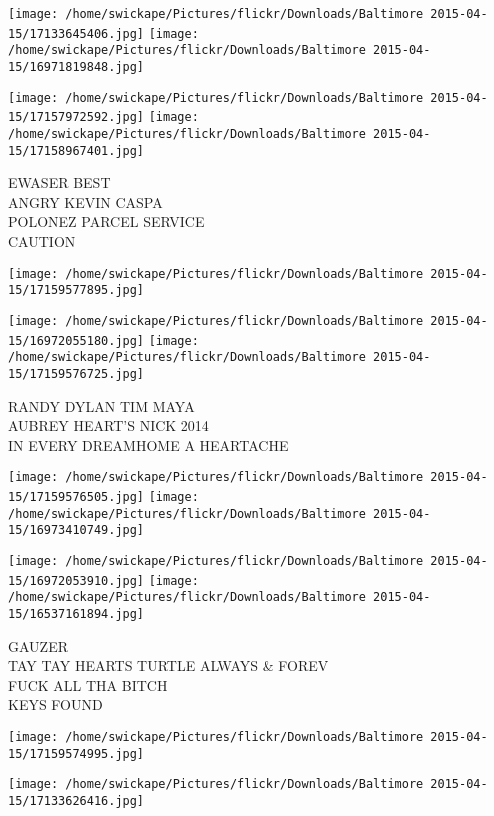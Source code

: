 \documentclass[10pt,letterpaper]{article}
\begin{document}
\texttt{[image: /home/swickape/Pictures/flickr/Downloads/Baltimore 2015-04-15/17133645406.jpg]}
\texttt{[image: /home/swickape/Pictures/flickr/Downloads/Baltimore 2015-04-15/16971819848.jpg]}

\texttt{[image: /home/swickape/Pictures/flickr/Downloads/Baltimore 2015-04-15/17157972592.jpg]}
\texttt{[image: /home/swickape/Pictures/flickr/Downloads/Baltimore 2015-04-15/17158967401.jpg]}

EWASER BEST\\
ANGRY KEVIN CASPA\\
POLONEZ PARCEL SERVICE\\
CAUTION
\pagebreak

\texttt{[image: /home/swickape/Pictures/flickr/Downloads/Baltimore 2015-04-15/17159577895.jpg]}

\vspace{0.25in}
\texttt{[image: /home/swickape/Pictures/flickr/Downloads/Baltimore 2015-04-15/16972055180.jpg]}
\texttt{[image: /home/swickape/Pictures/flickr/Downloads/Baltimore 2015-04-15/17159576725.jpg]}

RANDY DYLAN TIM MAYA\\
AUBREY HEART'S NICK 2014\\
IN EVERY DREAMHOME A HEARTACHE
\pagebreak

\texttt{[image: /home/swickape/Pictures/flickr/Downloads/Baltimore 2015-04-15/17159576505.jpg]}
\texttt{[image: /home/swickape/Pictures/flickr/Downloads/Baltimore 2015-04-15/16973410749.jpg]}

\texttt{[image: /home/swickape/Pictures/flickr/Downloads/Baltimore 2015-04-15/16972053910.jpg]}
\texttt{[image: /home/swickape/Pictures/flickr/Downloads/Baltimore 2015-04-15/16537161894.jpg]}

GAUZER\\
TAY TAY HEARTS TURTLE ALWAYS \& FOREV\\
FUCK ALL THA BITCH\\
KEYS FOUND
\pagebreak

\texttt{[image: /home/swickape/Pictures/flickr/Downloads/Baltimore 2015-04-15/17159574995.jpg]}

\vspace{0.25in}
\texttt{[image: /home/swickape/Pictures/flickr/Downloads/Baltimore 2015-04-15/17133626416.jpg]}
\end{document}
